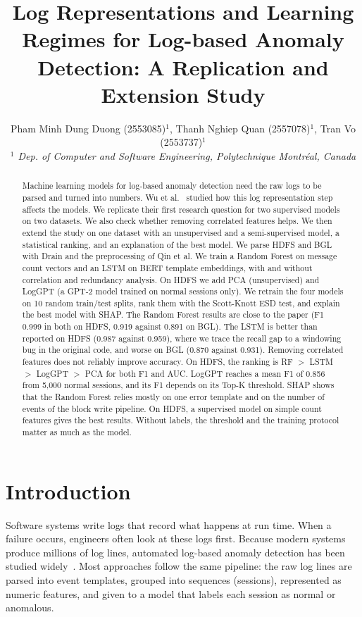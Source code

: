 \documentclass[10pt, conference]{IEEEtran}
\title{Log Representations and Learning Regimes for Log-based Anomaly Detection: A Replication and Extension Study}
\author{Pham Minh Dung Duong (2553085)$^{1}$, Thanh Nghiep Quan (2557078)$^{1}$, Tran Vo (2553737)$^{1}$
    \\
    \emph{$^{1}$ Dep. of Computer and Software Engineering, Polytechnique Montréal, Canada}}
\begin{document}
\maketitle

\begin{abstract}
Machine learning models for log-based anomaly detection need the raw logs to be parsed and turned into numbers. Wu et al.~\cite{wu2023effectiveness} studied how this log representation step affects the models.
We replicate their first research question for two supervised models on two datasets. We also check whether removing correlated features helps. We then extend the study on one dataset with an unsupervised and a semi-supervised model, a statistical ranking, and an explanation of the best model.
We parse HDFS and BGL with Drain and the preprocessing of Qin et al. We train a Random Forest on message count vectors and an LSTM on BERT template embeddings, with and without correlation and redundancy analysis. On HDFS we add PCA (unsupervised) and LogGPT (a GPT-2 model trained on normal sessions only). We retrain the four models on 10 random train/test splits, rank them with the Scott-Knott ESD test, and explain the best model with SHAP.
The Random Forest results are close to the paper (F1 0.999 in both on HDFS, 0.919 against 0.891 on BGL). The LSTM is better than reported on HDFS (0.987 against 0.959), where we trace the recall gap to a windowing bug in the original code, and worse on BGL (0.870 against 0.931). Removing correlated features does not reliably improve accuracy. On HDFS, the ranking is RF $>$ LSTM $>$ LogGPT $>$ PCA for both F1 and AUC. LogGPT reaches a mean F1 of 0.856 from 5,000 normal sessions, and its F1 depends on its Top-K threshold. SHAP shows that the Random Forest relies mostly on one error template and on the number of events of the block write pipeline.
On HDFS, a supervised model on simple count features gives the best results. Without labels, the threshold and the training protocol matter as much as the model.
\end{abstract}

\section{Introduction}
\label{sec:introduction}

Software systems write logs that record what happens at run time. When a failure occurs, engineers often look at these logs first. Because modern systems produce millions of log lines, automated log-based anomaly detection has been studied widely~\cite{he2016experience,du2017deeplog}. 
Most approaches follow the same pipeline: the raw log lines are parsed into event templates, grouped into sequences (sessions), represented as numeric features, and given to a model that labels each session as normal or anomalous.
\end{document}

